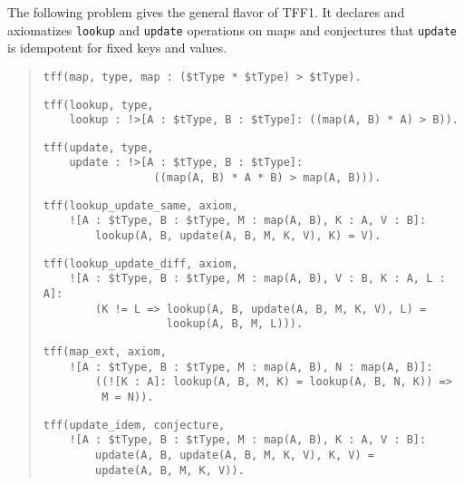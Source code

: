  The following problem gives the general flavor of TFF1.
It declares and axiomatizes {\tt lookup} and {\tt update} operations on
maps and conjectures that {\tt update} is idempotent for fixed keys and
values. %

\begin{quote}
\verb+tff(map, type, map : ($tType * $tType) > $tType).+
\par
\verb+tff(lookup, type,+\\
\verb+    lookup : !>[A : $tType, B : $tType]: ((map(A, B) * A) > B)).+\kern-10mm
\par
\pagebreak[1] %
\verb+tff(update, type,+\\
\verb+    update : !>[A : $tType, B : $tType]:+\\
\verb+                 ((map(A, B) * A * B) > map(A, B))).+
\par%
\pagebreak[2] %
\verb+tff(lookup_update_same, axiom,+\\
\verb+    ![A : $tType, B : $tType, M : map(A, B), K : A, V : B]:+\\
\verb+        lookup(A, B, update(A, B, M, K, V), K) = V).+
\par
\pagebreak[1] %
\verb+tff(lookup_update_diff, axiom,+\\
\verb+    ![A : $tType, B : $tType, M : map(A, B), V : B, K : A, L : A]:+\kern-10mm\\
\verb+        (K != L => lookup(A, B, update(A, B, M, K, V), L) =+\\
\verb+                   lookup(A, B, M, L))).+
\par
\pagebreak[1] %
\verb+tff(map_ext, axiom,+\\
\verb+    ![A : $tType, B : $tType, M : map(A, B), N : map(A, B)]:+\\
\verb+        ((![K : A]: lookup(A, B, M, K) = lookup(A, B, N, K)) =>+\kern-10mm\\
\verb+         M = N)).+
\par%
\pagebreak[2] %
\verb+tff(update_idem, conjecture,+\\
\verb+    ![A : $tType, B : $tType, M : map(A, B), K : A, V : B]:+\\
\verb+        update(A, B, update(A, B, M, K, V), K, V) =+\\
\verb+        update(A, B, M, K, V)).+
\end{quote}
